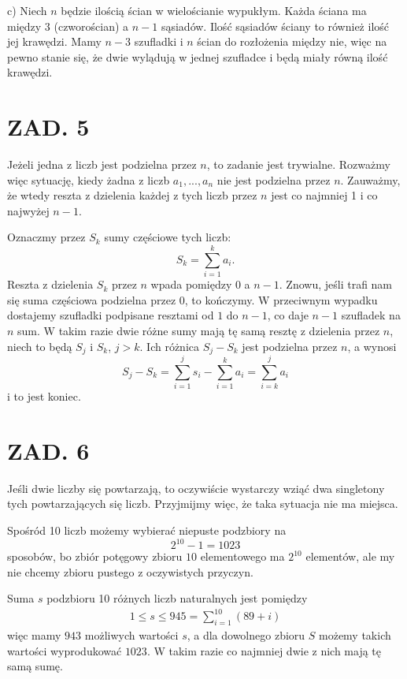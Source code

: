 \documentclass{article}[13pt]
\begin{document}
{\color{acc}c)} Niech $n$ będzie ilością ścian w wielościanie wypukłym. Każda ściana ma między $3$ (czworościan) a $n-1$ sąsiadów. Ilość sąsiadów ściany to również ilość jej krawędzi. Mamy $n-3$ szufladki i $n$ ścian do rozłożenia między nie, więc na pewno stanie się, że dwie wylądują w jednej szufladce i będą miały równą ilość krawędzi.

\section*{ZAD. 5}

Jeżeli jedna z liczb jest podzielna przez $n$, to zadanie jest trywialne. Rozważmy więc sytuację, kiedy żadna z liczb $a_1,..., a_n$ nie jest podzielna przez $n$. Zauważmy, że wtedy reszta z dzielenia każdej z tych liczb przez $n$ jest co najmniej 1 i co najwyżej $n-1$.
\smallskip

Oznaczmy przez $S_k$ sumy częściowe tych liczb:
$$S_k=\sum\limits_{i=1}^k a_i.$$
Reszta z dzielenia $S_k$ przez $n$ wpada pomiędzy $0$ a $n-1$. Znowu, jeśli trafi nam się suma częściowa podzielna przez $0$, to kończymy. W przeciwnym wypadku dostajemy szufladki podpisane resztami od $1$ do $n-1$, co daje $n-1$ szufladek na $n$ sum. W takim razie dwie różne sumy mają tę samą resztę z dzielenia przez $n$, niech to będą $S_j$ i $S_k$, $j>k$. Ich różnica $S_j-S_k$ jest podzielna przez $n$, a wynosi
$$S_j-S_k=\sum\limits_{i=1}^js_i-\sum\limits_{i=1}^ka_i=\sum\limits_{i=k}^ja_i$$
i to jest koniec.

\section*{ZAD. 6}

Jeśli dwie liczby się powtarzają, to oczywiście wystarczy wziąć dwa singletony tych powtarzających się liczb. Przyjmijmy więc, że taka sytuacja nie ma miejsca.
\smallskip

Spośród 10 liczb możemy wybierać niepuste podzbiory na 
$$2^{10}-1=1023$$ 
sposobów, bo zbiór potęgowy zbioru $10$ elementowego ma $2^{10}$ elementów, ale my nie chcemy zbioru pustego z oczywistych przyczyn.
\smallskip

Suma $s$ podzbioru 10 różnych liczb naturalnych jest pomiędzy
\begin{align*}
    1\leq s\leq 945=\sum\limits_{i=1}^{10}(89+i)
\end{align*}
więc mamy $943$ możliwych wartości $s$, a dla dowolnego zbioru $S$ możemy takich wartości wyprodukować $1023$. W takim razie co najmniej dwie z nich mają tę samą sumę.
\end{document}
